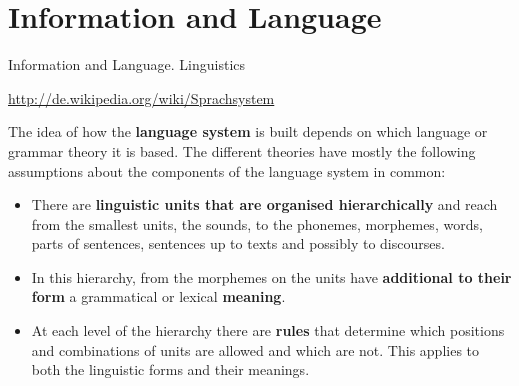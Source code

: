 \documentclass{beamer}
\newcommand{\ueberschrift}[1]{\begin{center}\bf #1\end{center}}
\begin{document}
\section{Information and Language}


\begin{frame}{Information and Language. Linguistics}\small
  
\url{http://de.wikipedia.org/wiki/Sprachsystem}

The idea of how the \textbf{language system} is built depends on which
language or grammar theory it is based. The different theories have mostly the
following assumptions about the components of the language system in common:
\begin{itemize}
\item There are \textbf{linguistic units that are organised hierarchically}
  and reach from the smallest units, the sounds, to the phonemes, morphemes,
  words, parts of sentences, sentences up to texts and possibly to discourses.
\item In this hierarchy, from the morphemes on the units have
  \textbf{additional to their form} a grammatical or lexical \textbf{meaning}.
\item At each level of the hierarchy there are \textbf{rules} that determine
  which positions and combinations of units are allowed and which are not.
  This applies to both the linguistic forms and their meanings.
\end{itemize}
\end{frame}
\end{document}
